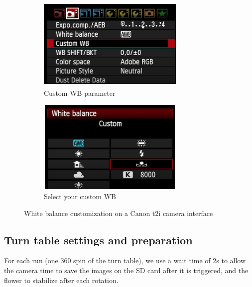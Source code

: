 \documentclass[10pt,letter,english]{article}
\begin{document}
\begin{figure}[H]
\centering
\begin{subfigure}[t]{.5\textwidth}
  \centering
  \includegraphics[width=7cm,height=4.5cm]{Figures/Custom WB setting.png}
  \caption{Custom WB parameter}
  \label{WB_sub1}
\end{subfigure}%
\begin{subfigure}[t]{.5\textwidth}
  \centering
  \includegraphics[width=7cm,height=4.5cm]{Figures/Custom WB selection.png}
  \caption{Select your custom WB}
  \label{WB_sub2}
\end{subfigure}
\caption{White balance customization on a Canon t2i camera interface}
\label{WB}
\end{figure}



\subsection{Turn table settings and preparation}

For each run (one 360\degree\hspace{0.01cm} spin of the turn table), we use a wait time of 2s to allow the camera time to save the images on the SD card after it is triggered, and the flower to stabilize after each rotation.
\end{document}
